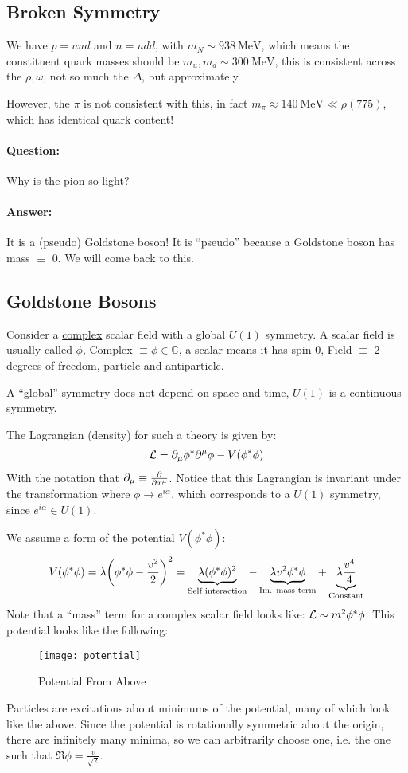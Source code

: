\subsection{Broken Symmetry}
We have $p=uud$ and $n=udd$, with $m_N\sim\SI{938}{\MeV}$, which means the constituent quark masses should be $m_u,m_d\sim\SI{300}{\MeV}$, this is consistent across the $\rho,\omega$, not so much the $\Delta$, but approximately.

However, the $\pi$ is not consistent with this, in fact $m_\pi\approx\SI{140}{\MeV}\ll\rho(775)$, which has identical quark content!

\paragraph{Question:} Why is the pion so light?
\paragraph{Answer:} It is a (pseudo) Goldstone boson! It is ``pseudo'' because a Goldstone boson has mass $\equiv$ 0. We will come back to this.

\subsection{Goldstone Bosons}
Consider a \underline{complex} scalar field with a global $U(1)$ symmetry. A scalar field is usually called $\phi$, Complex $\equiv\phi\in\mathbb{C}$, a scalar means it has spin $0$, Field $\equiv$ 2 degrees of freedom, particle and antiparticle.

A ``global'' symmetry does not depend on space and time, $U(1)$ is a continuous symmetry.

The Lagrangian (density) for such a theory is given by:
\begin{align*}
  \mathcal{L}=\partial_\mu\phi^*\partial^\mu\phi-V(\phi^*\phi)
\end{align*}
With the notation that $\partial_\mu\equiv\pdv{x^\mu}$. Notice that this Lagrangian is invariant under the transformation where $\phi\to e^{i\alpha}$, which corresponds to a $U(1)$ symmetry, since $e^{i\alpha}\in U(1)$.

We assume a form of the potential $V(\phi^*\phi)$:
\begin{align*}
  V(\phi^*\phi)=\lambda\qty(\phi^*\phi-\frac{v^2}{2})^2=
  \underbrace{\lambda(\phi^*\phi)^2}_{\text{Self interaction}}
  -\underbrace{\lambda v^2\phi^*\phi}_{\text{Im. mass term}}
  +\underbrace{\lambda \frac{v^4}{4}}_{\text{Constant}}
\end{align*}
Note that a ``mass'' term for a complex scalar field looks like: $\mathcal{L}\sim m^2\phi^*\phi$. This potential looks like the following:
\begin{figure}[H]
  \centering
  \texttt{[image: potential]}
  \caption{Potential From Above}
  \label{fig:potential}
\end{figure}
Particles are excitations about minimums of the potential, many of which look like the above. Since the potential is rotationally symmetric about the origin, there are infinitely many minima, so we can arbitrarily choose one, i.e. the one such that $\Re\phi=\frac{v}{\sqrt{2}}$.

